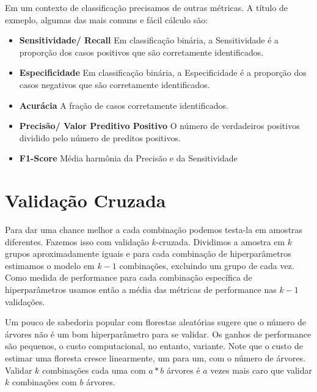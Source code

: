 Em um contexto de classificação precisamos de outras métricas. A título de exmeplo, algumas das mais comuns e fácil cálculo são:

\begin{itemize}
    \item \textbf{Sensitividade/ Recall} \newline
    Em classificação binária, a Sensitividade é a proporção dos casos positivos que são corretamente identificados.
    \item \textbf{Especificidade} \newline
    Em classificação binária, a Especificidade é a proporção dos casos negativos que são corretamente identificados.
    \item \textbf{Acurácia} \newline
    A fração de casos corretamente identificados. 
    \item \textbf{Precisão/ Valor Preditivo Positivo} \newline
    O número de verdadeiros positivos dividido pelo número de preditos positivos.
    \item \textbf{F1-Score} \newline
    Média harmônia da Precisão e da Sensitividade
    
\end{itemize}


\section{Validação Cruzada}

Para dar uma chance melhor a cada combinação podemos testa-la em amostras diferentes. Fazemos isso com validação $k$-cruzada. Dividimos a amostra em $k$ grupos aproximadamente iguais e para cada combinação de hiperparâmetros estimamos o modelo em $k-1$ combinações, excluindo um grupo de cada vez. Como medida de performance para cada combinação específica de hiperparâmetros usamos então a média das métricas de performance nas $k-1$ validações. 

Um pouco de sabedoria popular com florestas aleatórias sugere que o número de árvores não é um bom hiperparâmetro para se validar. Os ganhos de performance são pequenos, o custo computacional, no entanto, variante. Note que o custo de estimar uma floresta cresce linearmente, um para um, com o número de árvores. Validar $k$ combinações cada uma com $a*b$ árvores é $a$ vezes mais caro que validar $k$ combinações com $b$ árvores. 

